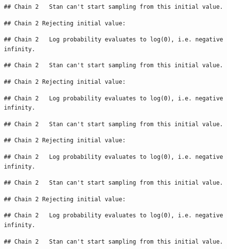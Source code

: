 \documentclass[
]{article}
\begin{document}
\begin{verbatim}
## Chain 2   Stan can't start sampling from this initial value.
\end{verbatim}

\begin{verbatim}
## Chain 2 Rejecting initial value:
\end{verbatim}

\begin{verbatim}
## Chain 2   Log probability evaluates to log(0), i.e. negative infinity.
\end{verbatim}

\begin{verbatim}
## Chain 2   Stan can't start sampling from this initial value.
\end{verbatim}

\begin{verbatim}
## Chain 2 Rejecting initial value:
\end{verbatim}

\begin{verbatim}
## Chain 2   Log probability evaluates to log(0), i.e. negative infinity.
\end{verbatim}

\begin{verbatim}
## Chain 2   Stan can't start sampling from this initial value.
\end{verbatim}

\begin{verbatim}
## Chain 2 Rejecting initial value:
\end{verbatim}

\begin{verbatim}
## Chain 2   Log probability evaluates to log(0), i.e. negative infinity.
\end{verbatim}

\begin{verbatim}
## Chain 2   Stan can't start sampling from this initial value.
\end{verbatim}

\begin{verbatim}
## Chain 2 Rejecting initial value:
\end{verbatim}

\begin{verbatim}
## Chain 2   Log probability evaluates to log(0), i.e. negative infinity.
\end{verbatim}

\begin{verbatim}
## Chain 2   Stan can't start sampling from this initial value.
\end{verbatim}
\end{document}
